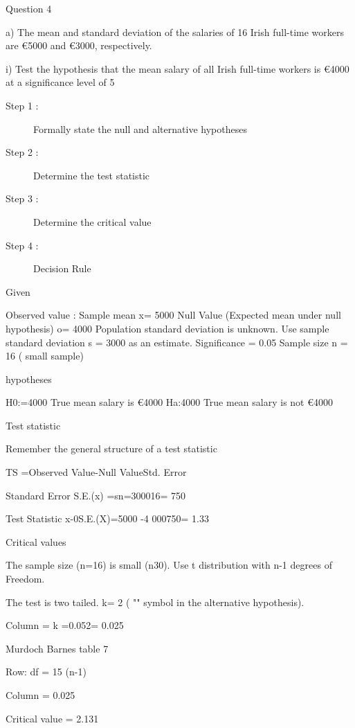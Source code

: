 \documentclass[12pt]{report}
\begin{document}
{%

Question 4

a) The mean and standard deviation of the salaries of 16 Irish full-time workers are €5000  and €3000, respectively.

i)  Test the hypothesis that the mean salary of all Irish full-time workers is €4000 at a significance level of 5%


\begin{description}
\item[Step 1 :] Formally state the null and alternative hypotheses
\item[Step 2 :] Determine the test statistic
\item[Step 3 :] Determine the critical value
\item[Step 4 :] Decision Rule
\end{description}



Given

Observed value : Sample mean     x= 5000 
Null Value (Expected mean under null hypothesis)     o= 4000   
Population standard deviation is unknown.
Use sample standard deviation s = 3000 as an estimate.
Significance  = 0.05
Sample size n = 16  ( small sample)

hypotheses

H0:=4000    True mean salary is €4000
Ha:4000    True mean salary is  not €4000

Test statistic

Remember the general structure of a test statistic

TS =Observed Value-Null ValueStd. Error 



Standard Error		S.E.(x) =sn=300016= 750

Test Statistic		x-0S.E.(X)=5000 -4 000750= 1.33


Critical values

The sample size (n=16) is small (n30). Use t distribution with n-1 degrees of Freedom.


The test is two tailed.  k= 2  ( "" symbol in the alternative hypothesis).


Column = k =0.052= 0.025


Murdoch Barnes table 7


Row: df = 15         (n-1)

Column = 0.025

Critical value =  2.131 

}
\end{document}
